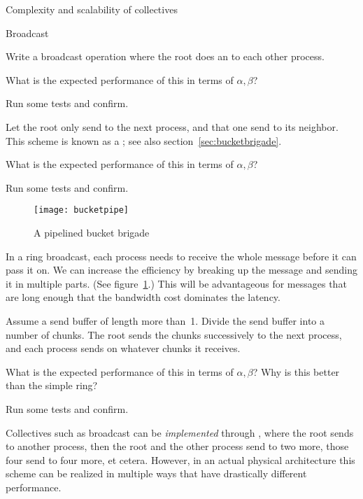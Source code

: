  {Complexity and scalability of collectives}

 {Broadcast}


Write a broadcast operation where the root does an  to
each other process.

What is the expected performance of this in terms of $\alpha,\beta$?

Run some tests and confirm.


Let the root only send to the next process, and that one send to its
neighbor. This scheme is known as a ; see
also section~\ref{sec:bucketbrigade}.

What is the expected performance of this in terms of $\alpha,\beta$?

Run some tests and confirm.

\begin{figure}[ht]
  \texttt{[image: bucketpipe]}
  \caption{A pipelined bucket brigade}
  \label{fig:pipe-bucket}
\end{figure}


In a ring broadcast, each process needs to receive the whole message
before it can pass it on. We can increase the efficiency by breaking
up the message and sending it in multiple parts.
(See figure~\ref{fig:pipe-bucket}.)
This will be
advantageous for messages that are long enough that the bandwidth cost
dominates the latency.

Assume a send buffer of length more than~1. Divide the send buffer
into a number of chunks. The root sends the chunks successively to the
next process, and each process sends on whatever chunks it receives.

What is the expected performance of this in terms of $\alpha,\beta$?
Why is this better than the simple ring?

Run some tests and confirm.


Collectives such as broadcast can be
\emph{implemented}
through
%
,
where the root sends to another process, then the root and the other
process send to two more, those four send to four more, et cetera.
However, in an actual physical architecture this scheme can be
realized in multiple ways that have drastically different performance.

